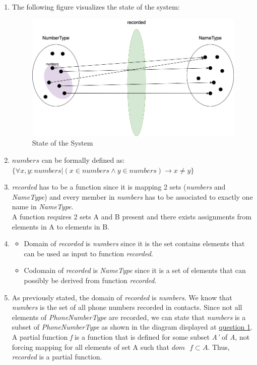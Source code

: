 \begin{enumerate}

\item The following figure visualizes the state of the system:
    \begin{figure}[h]
    \centering
    \includegraphics[scale=0.45]{images/Diagram.png}
    \caption{State of the System}
    \label{fig:Diagram}
    \end{figure}

\item $numbers$ can be formally defined as: \\
$\{ \forall x, y: numbers | (x \in numbers \wedge y \in numbers) \rightarrow x \neq y \}$

\item \emph{recorded} has to be a function since it is mapping 2 sets (\emph{numbers} and \emph{NameType}) and every member in \emph{numbers} has to be associated to exactly one name in \emph{NameType}. \\
A function requires 2 sets A and B present and there exists assignments from elements in A to elements in B.

\item 
    \begin{itemize}
        \item Domain of \emph{recorded} is \emph{numbers} since it is the set contains elements that can be used as input to function \emph{recorded}.
        \item Codomain of \emph{recorded} is \emph{NameType} since it is a set of elements that can possibly be derived from function \emph{recorded}.
    \end{itemize}
 
\item As previously stated, the domain of \emph{recorded} is \emph{numbers}. We know that \emph{numbers} is the set of all phone numbers recorded in contacts. Since not all elements of \emph{PhoneNumberType} are recorded, we can
state that \emph{numbers} is a subset of \emph{PhoneNumberType} as shown in the diagram displayed at \underline{question 1}.
A partial function \emph{f} is a function that is defined for some subset \emph{A'} of \emph{A}, not forcing mapping for 
all elements of set A such that $dom\text{  }f \subset A$. Thus, \emph{recorded} is a partial function.


\end{enumerate}
